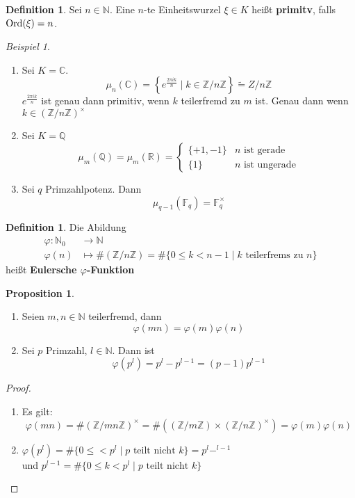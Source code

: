 \documentclass[10pt,a4paper]{article}
\newcommand{\N}{\ensuremath{\mathbb{N}}}
\newcommand{\Z}{\ensuremath{\mathbb{Z}}}
\newcommand{\Q}{\ensuremath{\mathbb{Q}}}
\newcommand{\R}{\ensuremath{\mathbb{R}}}
\newcommand{\C}{\ensuremath{\mathbb{C}}}
\newcommand{\F}{\ensuremath{\mathbb{F}}}
\newcommand{\isomorph}{\ensuremath{\tilde{=}}}
\newcommand{\ord}{\ensuremath\operatorname{Ord}}
\newcounter{thm}[section]
\theoremstyle{definition}
\newtheorem{definition}[thm]{Definition}
\newtheorem{prop}[thm]{Proposition}
\theoremstyle{plain}
\theoremstyle{remark}
\newtheorem{exm}[thm]{Beispiel}
\begin{document}
\begin{definition}
	Sei $n\in\N$. Eine $n$-te Einheitswurzel $\xi\in K$ heißt \textbf{primitv}, falls $\ord(\xi)=n$.
\end{definition}
\begin{exm}
	\begin{enumerate}
		\item Sei $K=\C$.
		\[\mu_n(\C)=\left\{e^\frac{2\pi i k}{n}\mid k\in\Z/n\Z\right\}\isomorph Z/n\Z\]
		$e^{\frac{2\pi i k}{n}}$ ist genau dann primitiv, wenn $k$ teilerfremd zu $m$ ist. Genau dann wenn $k\in(\Z/n\Z)^\times$
		\item Sei $K=\Q$
		\[\mu_m(\Q)=\mu_m(\R)=\begin{cases}
		\{+1,-1\}&\text{$n$ ist gerade}\\
		\{1\}&\text{$n$ ist ungerade}
		\end{cases}\]
		\item Sei $q$ Primzahlpotenz. Dann
		\[\mu_{q-1}(\F_q)=\F_q^\times\]
	\end{enumerate}
\end{exm}

\begin{definition}
	Die Abildung 
	\begin{align*}
	\varphi:\N_0&\to\N\\
	\varphi(n)&\mapsto\#(\Z/n\Z)=\#\{0\leq k<n-1\mid\text{$k$ teilerfrems zu $n$}\}
	\end{align*}
	heißt \textbf{Eulersche $\varphi$-Funktion}
\end{definition}
\begin{prop}\label{1109prop}
	\begin{enumerate}
		\item Seien $m,n\in\N$ teilerfremd, dann
		\[\varphi(mn)=\varphi(m)\varphi(n)\]
		\item Sei $p$ Primzahl, $l\in \N$. Dann ist
		\[\varphi(p^l)=p^l-p^{l-1}=(p-1)p^{l-1}\]
	\end{enumerate}
\end{prop}
\begin{proof}
\begin{enumerate}
	\item Es gilt:
	\[\varphi(mn)=\#(\Z/mn\Z)^\times=\#((\Z/m\Z)\times (\Z/n\Z)^\times)=\varphi(m)\varphi(n)\]
	\item $\varphi(p^l)=\#\{0\leq <p^l\mid\text{$p$ teilt nicht $k$}\}=p^l-^{l-1}$ \\
	und $p^{l-1}=\#\{0\leq k<p^l\mid \text{$p$ teilt nicht $k$} \}$
\end{enumerate}
\end{proof}
\end{document}
